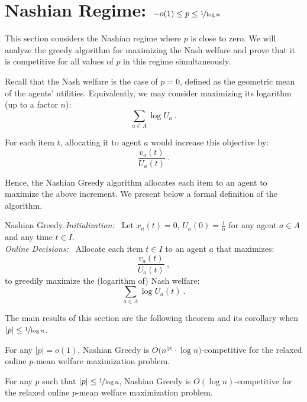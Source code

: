 \documentclass[11pt,letterpaper]{article}
\newcommand{\utility}{U}
\begin{document}
 \section[Nashian Regime]{Nashian Regime: $- o(1) \le p \le \nicefrac{1}{\log n}$}
\label{sec:nashian}

This section considers the Nashian regime where  $p$ is close to zero. 
We will analyze the greedy algorithm for maximizing the Nash welfare and prove that it is competitive for all values of $p$ in this regime simultaneously. 

Recall that the Nash welfare is the case of $p = 0$, defined as the geometric mean of the agents' utilities.
Equivalently, we may consider maximizing its logarithm (up to a factor $n$):
\[
        \sum_{a \in A} \log \utility_a
	~.
\]

For each item $t$, allocating it to agent $a$ would increase this objective by:
\[
	\frac{v_a(t)}{\utility_a(t)}
	~.
\]

Hence, the Nashian Greedy algorithm allocates each item to an agent to maximize the above increment.
We present below a formal definition of the algorithm.

\begin{algorithm}{Nashian Greedy}
	\emph{Initialization:~}
	Let $x_a(t) = 0$, $\utility_a(0) = \frac{1}{n}$ for any agent $a \in A$ and any time $t \in I$.\\[2ex]
	\emph{Online Decisions:~}
	Allocate each item $t \in I$ to an agent $a$ that maximizes:
	\[
		\frac{v_a(t)}{\utility_a(t)}
		~,
	\]
	to greedily maximize the (logarithm of) Nash welfare:
	\[
		\sum_{a \in A} \log \utility_a(t)
		~.
	\]
\end{algorithm}

The main results of this section are the following theorem and its corollary when $|p| \le \nicefrac{1}{\log n}$.

\begin{theorem}
	\label{thm:nashian}
	For any $|p| = o(1)$, Nashian Greedy is $O \big( n^{|p|} \cdot \log n \big)$-competitive for the relaxed online $p$-mean welfare maximization problem.
\end{theorem}

\begin{corollary}
	\label{cor:nashian}	
	For any $p$ such that $|p| \le \nicefrac{1}{\log n}$, Nashian Greedy is $O(\log n)$-competitive for the relaxed online $p$-mean welfare maximization problem.
\end{corollary}
\end{document}
